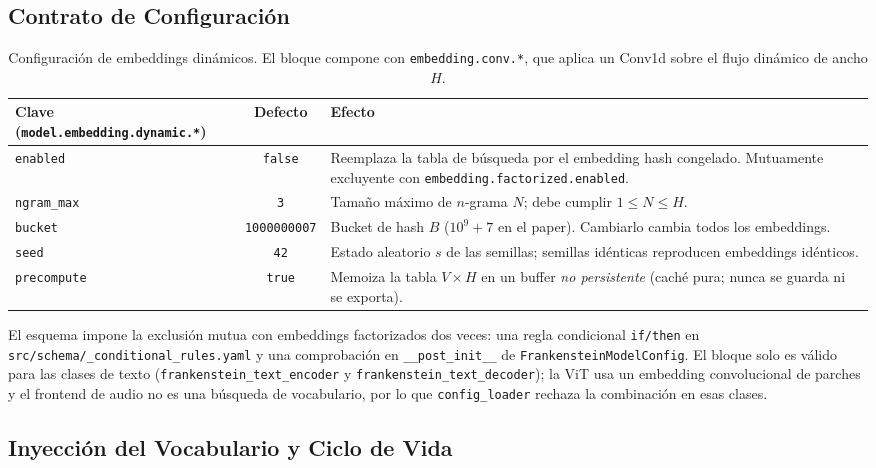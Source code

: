\subsection{Contrato de Configuración}

\begin{table}[H]
\centering
\small
\begin{tabularx}{\linewidth}{@{}l c X@{}}
\toprule
\textbf{Clave (\texttt{model.embedding.dynamic.*})} & \textbf{Defecto} & \textbf{Efecto} \\
\midrule
\texttt{enabled} & \texttt{false} & Reemplaza la tabla de búsqueda por el embedding hash congelado. Mutuamente excluyente con \texttt{embedding.factorized.enabled}. \\
\texttt{ngram\_max} & \texttt{3} & Tamaño máximo de $n$-grama $N$; debe cumplir $1 \le N \le H$. \\
\texttt{bucket} & \texttt{1000000007} & Bucket de hash $B$ ($10^9+7$ en el paper). Cambiarlo cambia todos los embeddings. \\
\texttt{seed} & \texttt{42} & Estado aleatorio $s$ de las semillas; semillas idénticas reproducen embeddings idénticos. \\
\texttt{precompute} & \texttt{true} & Memoiza la tabla $V\times H$ en un buffer \emph{no persistente} (caché pura; nunca se guarda ni se exporta). \\
\bottomrule
\end{tabularx}
\caption{Configuración de embeddings dinámicos. El bloque compone con \texttt{embedding.conv.*}, que aplica un Conv1d sobre el flujo dinámico de ancho $H$.}
\label{tab:dynamic-embedding-config-es}
\end{table}

El esquema impone la exclusión mutua con embeddings factorizados dos veces: una regla condicional \texttt{if/then} en \texttt{src/schema/\_conditional\_rules.yaml} y una comprobación en \texttt{\_\_post\_init\_\_} de \texttt{FrankensteinModelConfig}. El bloque solo es válido para las clases de texto (\texttt{frankenstein\_text\_encoder} y \texttt{frankenstein\_text\_decoder}); la ViT usa un embedding convolucional de parches y el frontend de audio no es una búsqueda de vocabulario, por lo que \texttt{config\_loader} rechaza la combinación en esas clases.

\subsection{Inyección del Vocabulario y Ciclo de Vida}

